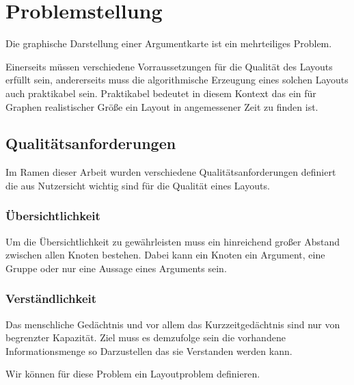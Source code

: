 
\section{Problemstellung}
Die graphische Darstellung einer Argumentkarte ist ein mehrteiliges Problem.

Einerseits müssen verschiedene Vorraussetzungen für die Qualität des Layouts erfüllt sein, andererseits muss die algorithmische Erzeugung eines solchen Layouts auch praktikabel sein. Praktikabel bedeutet in diesem Kontext das ein für Graphen realistischer Größe ein Layout in angemessener Zeit zu finden ist.

\subsection{Qualitätsanforderungen}
Im Ramen dieser Arbeit wurden verschiedene Qualitätsanforderungen definiert die aus Nutzersicht wichtig sind für die Qualität eines Layouts.

\subsubsection{Übersichtlichkeit}
Um die Übersichtlichkeit zu gewährleisten muss ein hinreichend großer Abstand zwischen allen Knoten bestehen. Dabei kann ein Knoten ein Argument, eine Gruppe oder nur eine Aussage eines Arguments sein.

\subsubsection{Verständlichkeit}
Das menschliche Gedächtnis und vor allem das Kurzzeitgedächtnis sind nur von begrenzter Kapazität. \cite{miller1956magical, BBS:84441} Ziel muss es demzufolge sein die vorhandene Informationsmenge so Darzustellen das sie Verstanden werden kann.



Wir können für diese Problem ein Layoutproblem definieren.

